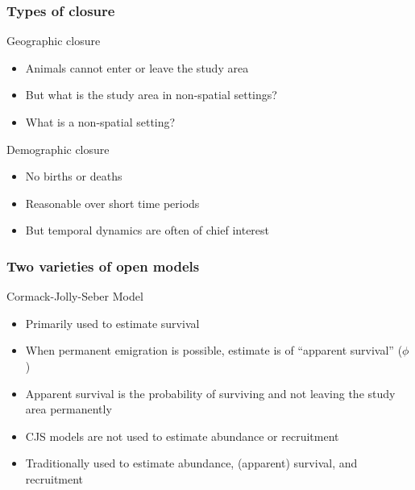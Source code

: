 \documentclass[color=usenames,dvipsnames]{beamer}\usepackage[]{graphicx}\usepackage[]{xcolor}
\begin{document}
\begin{frame}
  \frametitle{Types of closure}
  \large
  Geographic closure
  \begin{itemize}
    \normalsize
    \item Animals cannot enter or leave the study area
    \item But what is the study area in non-spatial settings?
    \item What is a non-spatial setting?
  \end{itemize}
  \pause
  \vfill
  \large
  Demographic closure
  \begin{itemize}
    \normalsize
    \item No births or deaths
    \item Reasonable over short time periods
    \item But temporal dynamics are often of chief interest
  \end{itemize}
\end{frame}





\begin{frame}
  \frametitle{Two varieties of open models}
  \large
  Cormack-Jolly-Seber Model
  \begin{itemize}%
    \normalsize
    \item<1-> Primarily used to estimate survival
    \item<2-> When permanent emigration is possible, estimate is of
      ``apparent survival'' ($\phi$)
    \item<3-> Apparent survival is the probability of
      surviving and not leaving the study area permanently
    \item<4-> CJS models are not used to estimate abundance or recruitment
  \end{itemize}
  \pause
  \vfill
  \large
  \normalsize
  \begin{itemize}
    \item<6-> Traditionally used to estimate abundance, (apparent)
      survival, and recruitment  
  \end{itemize}
  \pause
  \vfill
  \centering %
\end{frame}
\end{document}
